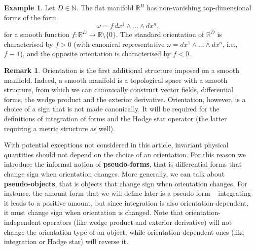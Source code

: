 \documentclass{elsarticle}
\theoremstyle{definition}
\newtheorem{example}[theorem]{Example}
\newtheorem{remark}[theorem]{Remark}
\newcommand{\N}{\mathbb{N}}
\newcommand{\R}{\mathbb{R}}
\newcommand{\newterm}[1]{\textbf{#1}}
\begin{document}
\begin{example}
  Let $D \in \N$.
  The flat manifold $\R^D$ has non-vanishing top-dimensional forms of the form
  \begin{equation}
    \omega = f\, d x^1 \wedge ... \wedge d x^n,
  \end{equation}
  for a smooth function $f \colon \R^D \to \R \setminus \{0\}$.
  The standard orientation of $\R^D$ is characterised by $f > 0$ (with canonical representative $\omega = d x^1 \wedge ... \wedge d x^n$, i.e., $f \equiv 1$), and the opposite orientation is characterised by $f < 0$.
\end{example}
\begin{remark}
  Orientation is the first additional structure imposed on a smooth manifold.
  Indeed, a smooth manifold is a topological space with a smooth structure, from which we can canonically construct vector fields, differential forms, the wedge product and the exterior derivative.
  Orientation, however, is a choice of a sign that is not made canonically.
  It will be required for the definitions of integration of forms and the Hodge star operator (the latter requiring a metric structure as well).

  With potential exceptions not considered in this article, invariant physical quantities should not depend on the choice of an orientation.
  For this reason we introduce the informal notion of \newterm{pseudo-forms}, that is differential forms that change sign when orientation changes.
  More generally, we can talk about \newterm{pseudo-objects}, that is objects that change sign when orientation changes.
  For instance, the amount form that we will define later is a pseudo-form -- integrating it leads to a positive amount, but since integration is also orientation-dependent, it must change sign when orientation is changed.
  Note that orientation-independent operators (like wedge product and exterior derivative) will not change the orientation type of an object, while orientation-dependent ones (like integration or Hodge star) will reverse it.


\end{remark}
\end{document}
